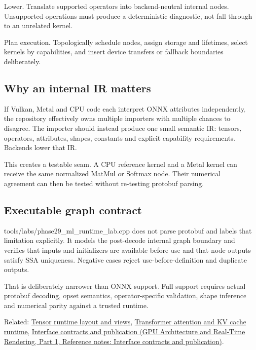 Lower. Translate supported operators into backend-neutral internal nodes. Unsupported operations must produce a deterministic diagnostic, not fall through to an unrelated kernel.

Plan execution. Topologically schedule nodes, assign storage and lifetimes, select kernels by capabilities, and insert device transfers or fallback boundaries deliberately.

\subsection{Why an internal IR matters}\label{appendix-a87217e3af2b-why-an-internal-ir-matters}

\hypertarget{appendix-a87217e3af2b-why-an-internal-ir-matters}{}

If Vulkan, Metal and CPU code each interpret ONNX attributes independently, the repository effectively owns multiple importers with multiple chances to disagree. The importer should instead produce one small semantic IR: tensors, operators, attributes, shapes, constants and explicit capability requirements. Backends lower that IR.

This creates a testable seam. A CPU reference kernel and a Metal kernel can receive the same normalized MatMul or Softmax node. Their numerical agreement can then be tested without re-testing protobuf parsing.

\subsection{Executable graph contract}\label{appendix-a87217e3af2b-executable-graph-contract}

\hypertarget{appendix-a87217e3af2b-executable-graph-contract}{}

tools/labs/phase29\_ml\_runtime\_lab.cpp does not parse protobuf and labels that limitation explicitly. It models the post-decode internal graph boundary and verifies that inputs and initializers are available before use and that node outputs satisfy SSA uniqueness. Negative cases reject use-before-definition and duplicate outputs.

That is deliberately narrower than ONNX support. Full support requires actual protobuf decoding, opset semantics, operator-specific validation, shape inference and numerical parity against a trusted runtime.

Related: \hyperref[appendix-cebadf3106d1]{Tensor runtime layout and views}, \hyperref[appendix-ea2dadd21ce5]{Transformer attention and KV cache runtime}, \href{../06-GPU-Architecture-and-Real-Time-Rendering-P01/main.pdf\#nameddest=appendix-fdae7ff0a23f}{Interface contracts and publication (GPU Architecture and Real-Time Rendering, Part 1, Reference notes: Interface contracts and publication)}.

